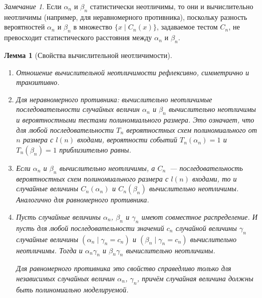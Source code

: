 \documentclass[12pt]{article}
\theoremstyle{definition}
\theoremstyle{plain}
\newtheorem{lemma}{Лемма}[section]
\theoremstyle{remark}
\newtheorem{remark}{Замечание}[section]
\begin{document}
\begin{remark}
Если $\alpha_n$ и $\beta_n$ статистически неотличимы,
то они и вычислительно неотличимы (например, для неравномерного
противника), поскольку разность вероятностей $\alpha_n$
и $\beta_n$ в множество $\{x\mid C_n(x)\}$, задаваемое
тестом $C_n$, не превосходит статистического расстояния
между $\alpha_n$ и $\beta_n$.
\end{remark}

\begin{lemma}[Свойства вычислительной неотличимости]
\mbox{}
\begin{enumerate}
\item Отношение вычислительной неотличимости рефлексивно, симметрично и транзитивно.

\item Для неравномерного противника: вычислительно неотличимые
последовательности случайных величин $\alpha_n$ и $\beta_n$
вычислительно неотличимы и вероятностными тестами 
полиномиального размера. Это означает, что для любой последовательности
$T_n$ вероятностных схем полиномиального от $n$ размера с $l(n)$
входами, вероятности событий $T_n(\alpha_n) = 1$ и $T_n(\beta_n) = 1$
приблизительно равны.

\item Если $\alpha_n$ и $\beta_n$ вычислительно неотличимы,
а $C_n$~--- последовательность вероятностных схем полиномиального размера с $l(n)$ входами, то и случайные
величины $C_n(\alpha_n)$ и $C_n(\beta_n)$ вычислительно
неотличимы. Аналогично для равномерного противника.

\item Пусть случайные величины $\alpha_n$, $\beta_n$
и $\gamma_n$ имеют совместное распределение. И пусть
для любой последовательности значений $c_n$ случайной
величины $\gamma_n$ случайные величины 
$(\alpha_n\mid\gamma_n = c_n)$ и 
$(\beta_n\mid\gamma_n = c_n)$ вычислительно неотличимы.
Тогда и $\alpha_n\gamma_n$ и $\beta_n\gamma_n$ вычислительно
неотличимы.

Для равномерного противника это свойство справедливо только
для независимых случайных величин $\alpha_n$, $\gamma_n$,
причём случайная величина должны быть полиномиально моделируемой.
\end{enumerate}
\end{lemma}
\end{document}
